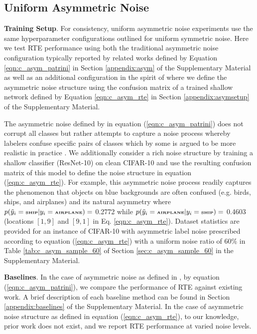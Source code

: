 \documentclass{article}
\begin{document}
\subsection{Uniform Asymmetric Noise}
\label{sec:expt_asym}
\textbf{Training Setup}.  For consistency, uniform asymmetric noise experiments use the same hyperparameter configurations outlined for uniform symmetric noise. Here we test RTE performance using both the traditional asymmetric noise configuration \cite{patrini2016} typically reported by related works defined by Equation \ref{eqn:c_asym_patrini} in Section \ref{appendix:asym} of the Supplementary Material as well as an additional configuration in the spirit of \cite{lee2019} where we define the asymmetric noise structure using the confusion matrix of a trained shallow network defined by Equation \ref{eqn:c_asym_rte} in Section \ref{appendix:asymsetup} of the Supplementary Material.

The asymmetric noise defined by \cite{patrini2016} in equation (\ref{eqn:c_asym_patrini}) does not corrupt all classes but rather attempts to capture a noise process whereby labelers confuse specific pairs of classes which by some is argued to be more realistic in practice \cite{han2018,ren2018}.  We additionally consider a rich noise structure by training a shallow classifier (ResNet-10) on clean CIFAR-10 and use the resulting confusion matrix of this model to define the noise structure in equation (\ref{eqn:c_asym_rte}). For example, this asymmetric noise process readily captures the phenomenon that objects on blue backgrounds are often confused (e.g. birds, ships, and airplanes) and its natural asymmetry where $p(\tilde{y}_i=\tiny\textbf{SHIP}\vert y_i = \tiny\textbf{AIRPLANE})=$ 0.2772 while $p(\tilde{y}_i=\tiny\textbf{AIRPLANE} \vert y_i = \tiny\textbf{SHIP})=$ 0.4603 (locations $[1, 9]$ and $[9, 1]$ in Eq. \ref{eqn:c_asym_rte}).  Dataset statistics are provided for an instance of CIFAR-10 with asymmetric label noise prescribed according to equation (\ref{eqn:c_asym_rte}) with a uniform noise ratio of 60\% in Table \ref{tab:c_asym_sample_60} of Section \ref{sec:c_asym_sample_60} in the Supplementary Material.

\textbf{Baselines}. In the case of asymmetric noise as defined in \cite{patrini2016}, by equation (\ref{eqn:c_asym_patrini}), we compare the performance of RTE against existing work.  A brief description of each baseline method can be found in Section \ref{appendix:baselines} of the Supplementary Material.  In the case of asymmetric noise structure as defined in equation (\ref{eqn:c_asym_rte}), to our knowledge, prior work does not exist, and we report RTE performance at varied noise levels.
\end{document}
